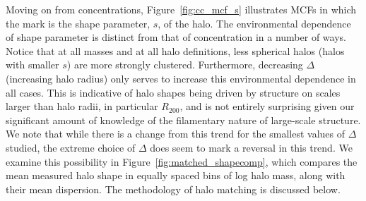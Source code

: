 \documentclass[usenatbib]{mnras}
\begin{document}
Moving on from concentrations, Figure~\ref{fig:cc_mcf_s} illustrates MCFs in which the mark is the shape
parameter, $s$, of the halo. The environmental dependence of shape parameter is distinct from that of
concentration in a number of ways. Notice that at all masses and at all halo definitions, less spherical halos
(halos with smaller $s$) are more strongly clustered. Furthermore, decreasing $\Delta$ (increasing halo radius)
only serves to increase this environmental dependence in all cases. This is indicative of halo shapes being
driven by structure on scales larger than halo radii, in particular $R_{200}$, and is not entirely surprising
given our significant amount of knowledge of the filamentary nature of large-scale structure. We note that while
there is a change from this trend for the smallest values of $\Delta$ studied, the extreme choice of $\Delta$ does
seem to mark a reversal in this trend. We examine this possibility in Figure~\ref{fig:matched_shapecomp},
which compares the mean measured halo shape in equally spaced bins of log halo mass, along with their mean
dispersion. The methodology of halo matching is discussed below.
\end{document}
